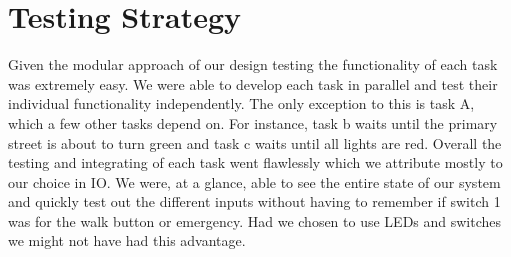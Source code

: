 \documentclass[10pt]{article}
\begin{document}


\section*{Testing Strategy}
Given the modular approach of our design testing the functionality of each task
was extremely easy.  We were able to develop each task in parallel and test
their individual functionality independently.  The only exception to this is
task A, which a few other tasks depend on. For instance, task b waits until the
primary street is about to turn green and task c waits until all lights are
red. Overall the testing and integrating of each task went flawlessly which we
attribute mostly to our choice in IO. We were, at a glance, able to see the
entire state of our system and quickly test out the different inputs without
having to remember if switch 1 was for the walk button or emergency. Had we
chosen to use LEDs and switches we might not have had this advantage.
\end{document}
